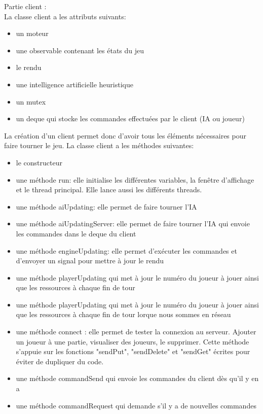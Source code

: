 \documentclass[12pt,a4paper]{article}
\begin{document}
Partie client : \\
La classe client a les attributs suivants:
\begin{itemize}
    \item un moteur
    \item une observable contenant les états du jeu
    \item le rendu
    \item une intelligence artificielle heuristique
    \item un mutex
    \item un deque qui stocke les commandes effectuées par le client (IA ou joueur)
\end{itemize}
La création d'un client permet donc d'avoir tous les éléments nécessaires pour faire tourner le jeu. 
La classe client a les méthodes suivantes:
\begin{itemize}
    \item le constructeur
    \item une méthode run: elle initialise les différentes variables, la fenêtre d'affichage et le thread principal. Elle lance aussi les différents threads.
    \item une méthode aiUpdating: elle permet de faire tourner l'IA 
    \item une méthode aiUpdatingServer: elle permet de faire tourner l'IA qui envoie les commandes dans le deque du client
    \item une méthode engineUpdating: elle permet d'exécuter les commandes et d'envoyer un signal pour mettre à jour le rendu
    \item une méthode playerUpdating qui met à jour le numéro du joueur à jouer ainsi que les ressources à chaque fin de tour
    \item une méthode playerUpdating qui met à jour le numéro du joueur à jouer ainsi que les ressources à chaque fin de tour lorque nous sommes en réseau
    \item une méthode connect : elle permet de tester la connexion au serveur. Ajouter un joueur à une partie, visualiser des joueurs, le supprimer. Cette méthode s'appuie sur les fonctions "sendPut", "sendDelete" et "sendGet" écrites pour éviter de dupliquer du code.
    \item une méthode commandSend qui envoie les commandes du client dès qu'il y en a 
    \item une méthode commandRequest qui demande s'il y a de nouvelles commandes
\end{itemize}
\end{document}
